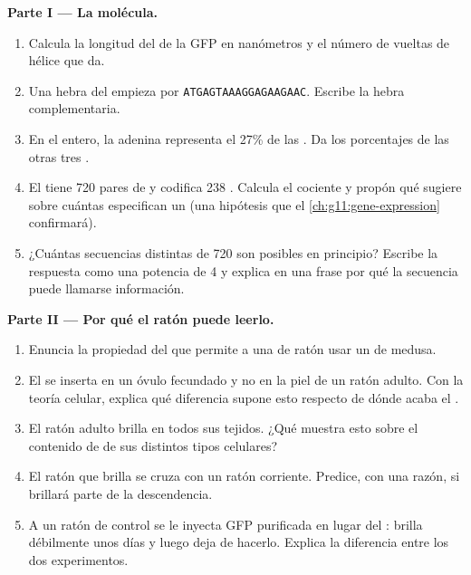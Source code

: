 \begin{problem}
\medskip
\noindent\textbf{Parte I --- La molécula.}
\begin{enumerate}
  \item Calcula la longitud del  de la GFP en nanómetros y el número
        de vueltas de hélice que da.
  \item Una hebra del  empieza por
        \texttt{ATGAGTAAAGGAGAAGAAC}. Escribe la hebra complementaria.
  \item En el  entero, la adenina representa el 27\% de las .
        Da los porcentajes de las otras tres .
  \item El  tiene 720 pares de  y codifica 238 .
        Calcula el cociente y propón qué sugiere sobre cuántas 
        especifican un  (una hipótesis que el
        \cref{ch:g11:gene-expression} confirmará).
  \item ¿Cuántas secuencias distintas de 720  son posibles en
        principio? Escribe la respuesta como una potencia de 4 y
        explica en una frase por qué la secuencia puede llamarse
        información.
\end{enumerate}

\medskip
\noindent\textbf{Parte II --- Por qué el ratón puede leerlo.}
\begin{enumerate}[resume]
  \item Enuncia la propiedad del  que permite a una  de ratón
        usar un  de medusa.
  \item El  se inserta en un óvulo fecundado y no en la piel de un
        ratón adulto. Con la teoría celular, explica qué diferencia
        supone esto respecto de dónde acaba el .
  \item El ratón adulto brilla en todos sus tejidos. ¿Qué muestra esto
        sobre el contenido de  de sus distintos tipos celulares?
  \item El ratón que brilla se cruza con un ratón corriente. Predice,
        con una razón, si brillará parte de la descendencia.
  \item A un ratón de control se le inyecta  GFP purificada en
        lugar del : brilla débilmente unos días y luego deja de
        hacerlo. Explica la diferencia entre los dos experimentos.
\end{enumerate}


\end{problem}
